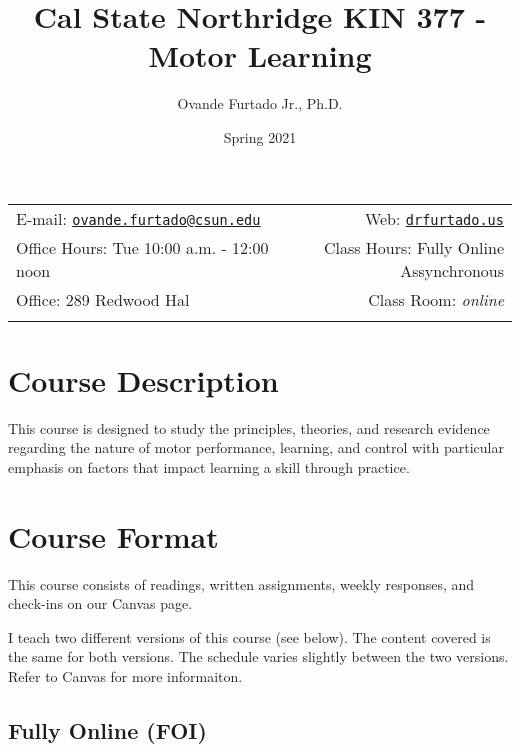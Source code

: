 \documentclass[11pt,]{article}
\title{Cal State Northridge \textbar{} KIN 377 - Motor Learning}
\author{Ovande Furtado Jr., Ph.D.}
\date{Spring 2021}
\begin{document}
  

		\maketitle
		
	
		\thispagestyle{firststyle}



	\noindent \begin{tabular*}{\textwidth}{ @{\extracolsep{\fill}} lr @{\extracolsep{\fill}}}


E-mail: \texttt{\href{mailto:ovande.furtado@csun.edu}{\nolinkurl{ovande.furtado@csun.edu}}} & Web: \href{http://drfurtado.us}{\tt drfurtado.us}\\
Office Hours: Tue 10:00 a.m. - 12:00 noon  &  Class Hours: Fully Online
Assynchronous\\
Office: 289 Redwood Hal  & Class Room: \emph{online}\\
	&  \\
	\hline
	\end{tabular*}
	
\vspace{2mm}
	


\hypertarget{course-description}{%
\section{Course Description}\label{course-description}}

This course is designed to study the principles, theories, and research
evidence regarding the nature of motor performance, learning, and
control with particular emphasis on factors that impact learning a skill
through practice.

\hypertarget{course-format}{%
\section{Course Format}\label{course-format}}

This course consists of readings, written assignments, weekly responses,
and check-ins on our Canvas page.

I teach two different versions of this course (see below). The content
covered is the same for both versions. The schedule varies slightly
between the two versions. Refer to Canvas for more informaiton.

\hypertarget{fully-online-foi}{%
\subsection{Fully Online (FOI)}\label{fully-online-foi}}
\end{document}

